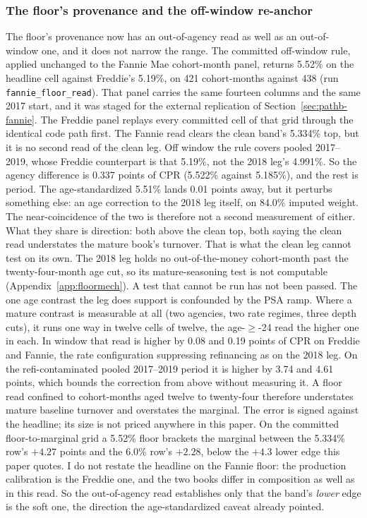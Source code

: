 \documentclass[12pt]{article}
\begin{document}
\subsubsection{The floor's provenance and the off-window re-anchor}

The floor's provenance now has an out-of-agency read as well as an out-of-window one, and it does not narrow the range. The committed off-window rule, applied unchanged to the Fannie Mae cohort-month panel, returns 5.52\% on the headline cell against Freddie's 5.19\%, on 421 cohort-months against 438 (run \texttt{fannie\_floor\_read}). That panel carries the same fourteen columns and the same 2017 start, and it was staged for the external replication of Section~\ref{sec:pathb-fannie}. The Freddie panel replays every committed cell of that grid through the identical code path first. The Fannie read clears the clean band's 5.334\% top, but it is no second read of the clean leg. Off window the rule covers pooled 2017--2019, whose Freddie counterpart is that 5.19\%, not the 2018 leg's 4.991\%. So the agency difference is 0.337 points of CPR (5.522\% against 5.185\%), and the rest is period. The age-standardized 5.51\% lands 0.01 points away, but it perturbs something else: an age correction to the 2018 leg itself, on 84.0\% imputed weight. The near-coincidence of the two is therefore not a second measurement of either. What they share is direction: both above the clean top, both saying the clean read understates the mature book's turnover. That is what the clean leg cannot test on its own. The 2018 leg holds no out-of-the-money cohort-month past the twenty-four-month age cut, so its mature-seasoning test is not computable (Appendix~\ref{app:floormech}). A test that cannot be run has not been passed. The one age contrast the leg does support is confounded by the PSA ramp. Where a mature contrast is measurable at all (two agencies, two rate regimes, three depth cuts), it runs one way in twelve cells of twelve, the age-$\geq$-24 read the higher one in each. In window that read is higher by 0.08 and 0.19 points of CPR on Freddie and Fannie, the rate configuration suppressing refinancing as on the 2018 leg. On the refi-contaminated pooled 2017--2019 period it is higher by 3.74 and 4.61 points, which bounds the correction from above without measuring it. A floor read confined to cohort-months aged twelve to twenty-four therefore understates mature baseline turnover and overstates the marginal. The error is signed against the headline; its size is not priced anywhere in this paper. On the committed floor-to-marginal grid a 5.52\% floor brackets the marginal between the 5.334\% row's $+4.27$ points and the 6.0\% row's $+2.28$, below the $+4.3$ lower edge this paper quotes. I do not restate the headline on the Fannie floor: the production calibration is the Freddie one, and the two books differ in composition as well as in this read. So the out-of-agency read establishes only that the band's \emph{lower} edge is the soft one, the direction the age-standardized caveat already pointed.
\end{document}
